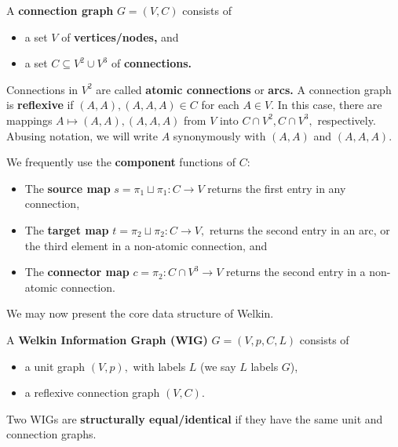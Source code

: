 \begin{itemize}
\begin{definition}
  A \textbf{connection graph} $G = (V, C)$ consists of
  \begin{itemize}
    \item a set $V$ of \textbf{vertices/nodes,} and
    \item a set $C \subseteq V^{2} \cup V^{3}$ of \textbf{connections.} %
  \end{itemize}
  Connections in $V^{2}$ are called \textbf{atomic connections} or \textbf{arcs.} A connection graph is \textbf{reflexive} if $(A, A), (A, A, A) \in C$ for each $A \in V.$ In this case, there are mappings $A \mapsto (A, A), (A, A, A)$ from $V$ into $C \cap V^{2}, C \cap V^{3},$ respectively. Abusing notation, we will write $A$ synonymously with $(A, A)$ and $(A, A, A).$

  We frequently use the \textbf{component} functions of $C$:
  \begin{itemize}
  \item The \textbf{source map} $s = \pi_{1} \sqcup \pi_{1}: C \to V$ returns the first entry in any connection,
  \item The \textbf{target map} $t = \pi_{2} \sqcup \pi_{2}: C \to V,$ returns the second entry in an arc, or the third element in a non-atomic connection, and
  \item The \textbf{connector map} $c = \pi_{2}: C \cap V^{3} \to V$ returns the second entry in a non-atomic connection.
  \end{itemize}
\end{definition}



We may now present the core data structure of Welkin.

\begin{definition} A \textbf{Welkin Information Graph (WIG)} $G = (V, p, C, L)$ consists of
  \begin{itemize}
    \item a unit graph $(V, p),$ with labels $L$ (we say $L$ labels $G$),
    \item a reflexive connection graph $(V, C).$
  \end{itemize}
  Two WIGs are \textbf{structurally equal/identical} if they have the same unit and connection graphs.
\end{definition}
\label{def:wig}


\end{itemize}
